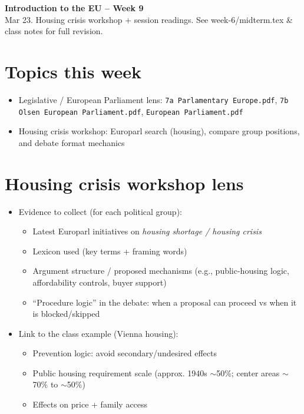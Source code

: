 \documentclass[10pt,a4paper]{article}
\begin{document}
\begin{center}
{\large\bfseries\color{eublue} Introduction to the EU -- Week 9}\\[0.2em]
\footnotesize Mar 23. Housing crisis workshop + session readings. See week-6/midterm.tex \& class notes for full revision.
\end{center}\vspace{0.5em}

\section*{\color{eublue}Topics this week}
\begin{itemize}
\item Legislative / European Parliament lens: \texttt{7a Parlamentary Europe.pdf}, \texttt{7b Olsen European Parliament.pdf}, \texttt{European Parliament.pdf}
\item Housing crisis workshop: Europarl search (housing), compare group positions, and debate format mechanics
\end{itemize}

\section*{\color{eublue}Housing crisis workshop lens}
\begin{itemize}
\item Evidence to collect (for each political group):
   \begin{itemize}
   \item Latest Europarl initiatives on \emph{housing shortage / housing crisis}
   \item Lexicon used (key terms + framing words)
   \item Argument structure / proposed mechanisms (e.g., public-housing logic, affordability controls, buyer support)
   \item “Procedure logic” in the debate: when a proposal can proceed vs when it is blocked/skipped
   \end{itemize}
\item Link to the class example (Vienna housing):
   \begin{itemize}
   \item Prevention logic: avoid secondary/undesired effects
   \item Public housing requirement scale (approx. 1940s $\sim$50\%; center areas $\sim$70\% to $\sim$50\%)
   \item Effects on price + family access
   \end{itemize}
\end{itemize}
\end{document}
